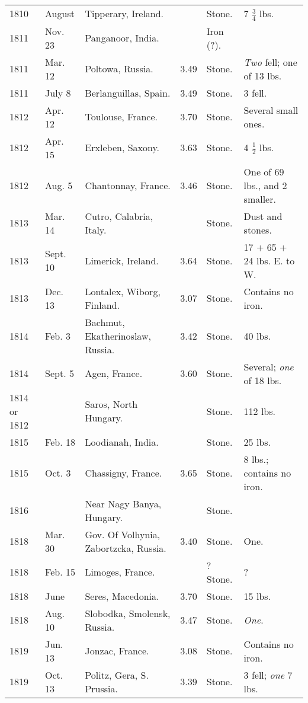 \documentclass[a4paper, 12pt, oneside]{article}
\begin{document}
\begin{center}
\begin{longtable}{|p{10mm}|p{15mm}|p{32mm}|p{13mm}|p{13mm}|p{26mm}|}
        1810 & August & Tipperary, Ireland. & ~ & Stone. & 7 $\frac{3}{4}$ lbs. \\
        1811 & Nov. 23 & Panganoor, India. & ~ & Iron (?). & ~ \\
        1811 & Mar. 12 & Poltowa, Russia. & 3.49 & Stone. & \emph{Two} fell; one of 13 lbs. \\
        1811 & July 8 & Berlanguillas, Spain. & 3.49 & Stone. & 3 fell. \\
        1812 & Apr. 12 & Toulouse, France. & 3.70 & Stone. & Several small ones. \\
        1812 & Apr. 15 & Erxleben, Saxony. & 3.63 & Stone. & 4 $\frac{1}{2}$ lbs. \\
        1812 & Aug. 5 & Chantonnay, France. & 3.46 & Stone. & One of 69 lbs., and 2 smaller. \\
        1813 & Mar. 14 & Cutro, Calabria, Italy. & ~ & Stone. & Dust and stones. \\
        1813 & Sept. 10 & Limerick, Ireland. & 3.64 & Stone. & 17 + 65 + 24 lbs. E. to W. \\
        1813 & Dec. 13 & Lontalex, Wiborg, Finland. & 3.07 & Stone. & Contains no iron. \\
        1814 & Feb. 3 & Bachmut, Ekatherinoslaw, Russia. & 3.42 & Stone. & 40 lbs. \\
        1814 & Sept. 5 & Agen, France. & 3.60 & Stone. & Several; \emph{one} of 18 lbs. \\
        1814 or 1812 & ~ & Saros, North Hungary. & ~ & Stone. & 112 lbs. \\
        1815 & Feb. 18 & Loodianah, India. & ~ & Stone. & 25 lbs. \\
        1815 & Oct. 3 & Chassigny, France. & 3.65 & Stone. & 8 lbs.; contains no iron. \\
        1816 & ~ & Near Nagy Banya, Hungary. & ~ & Stone. & ~ \\
        1818 & Mar. 30 & Gov. Of Volhynia, Zabortzcka, Russia. & 3.40 & Stone. & One. \\
        1818 & Feb. 15 & Limoges, France. & ~ & ? Stone. & ? \\
        1818 & June & Seres, Macedonia. & 3.70 & Stone. & 15 lbs. \\
        1818 & Aug. 10 & Slobodka, Smolensk, Russia. & 3.47 & Stone. & \emph{One}. \\
        1819 & Jun. 13 & Jonzac, France. & 3.08 & Stone. & Contains no iron. \\
        1819 & Oct. 13 & Politz, Gera, S. Prussia. & 3.39 & Stone. & 3 fell; \emph{one} 7 lbs. \\

\end{longtable}
\end{center}
\end{document}
